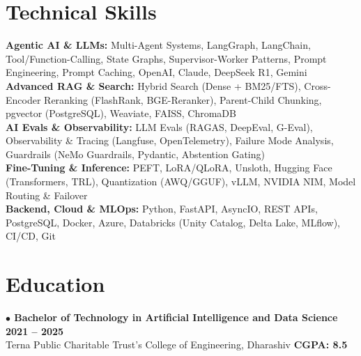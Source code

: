 \documentclass[a4paper,10pt]{article}
\begin{document}
\section{Technical Skills}
\vspace{2pt}
\small
\textbf{Agentic AI \& LLMs:} Multi-Agent Systems, LangGraph, LangChain, Tool/Function-Calling, State Graphs, Supervisor-Worker Patterns, Prompt Engineering, Prompt Caching, OpenAI, Claude, DeepSeek R1, Gemini \\[3.5pt]
\textbf{Advanced RAG \& Search:} Hybrid Search (Dense + BM25/FTS), Cross-Encoder Reranking (FlashRank, BGE-Reranker), Parent-Child Chunking, pgvector (PostgreSQL), Weaviate, FAISS, ChromaDB \\[3.5pt]
\textbf{AI Evals \& Observability:} LLM Evals (RAGAS, DeepEval, G-Eval), Observability \& Tracing (Langfuse, OpenTelemetry), Failure Mode Analysis, Guardrails (NeMo Guardrails, Pydantic, Abstention Gating) \\[3.5pt]
\textbf{Fine-Tuning \& Inference:} PEFT, LoRA/QLoRA, Unsloth, Hugging Face (Transformers, TRL), Quantization (AWQ/GGUF), vLLM, NVIDIA NIM, Model Routing \& Failover \\[3.5pt]
\textbf{Backend, Cloud \& MLOps:} Python, FastAPI, AsyncIO, REST APIs, PostgreSQL, Docker, Azure, Databricks (Unity Catalog, Delta Lake, MLflow), CI/CD, Git

\vspace{5pt}

\section{Education}
\noindent
\textbf{\normalsize $\bullet$ Bachelor of Technology in Artificial Intelligence and Data Science} \hfill \textbf{2021 -- 2025} \\
Terna Public Charitable Trust's College of Engineering, Dharashiv \hfill \textbf{CGPA: 8.5}
\end{document}
